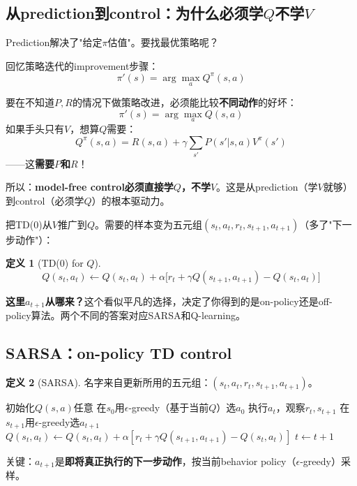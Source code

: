 \documentclass[11pt,a4paper]{article}
\theoremstyle{definition}
\newtheorem{definition}{定义}[section]
\begin{document}
\subsection{从prediction到control：为什么必须学$Q$不学$V$}

Prediction解决了"给定$\pi$估值"。要找最优策略呢？

回忆策略迭代的improvement步骤：
\[
\pi'(s) = \arg\max_a Q^\pi(s, a)
\]

\begin{plainwords}
要在不知道$P, R$的情况下做策略改进，必须能比较\textbf{不同动作}的好坏：
\[
\pi'(s) = \arg\max_a Q(s, a)
\]
如果手头只有$V$，想算$Q$需要：
\[
Q^\pi(s, a) = R(s, a) + \gamma \sum_{s'} P(s'|s, a) V^\pi(s')
\]
——这\textbf{需要$P$和$R$}！

所以：\textbf{model-free control必须直接学$Q$，不学$V$}。这是从prediction（学$V$就够）到control（必须学$Q$）的根本驱动力。
\end{plainwords}

把TD(0)从$V$推广到$Q$。需要的样本变为五元组$(s_t, a_t, r_t, s_{t+1}, a_{t+1})$（多了"下一步动作"）：

\begin{definition}[TD(0) for $Q$]
\[
Q(s_t, a_t) \leftarrow Q(s_t, a_t) + \alpha\big[r_t + \gamma Q(s_{t+1}, a_{t+1}) - Q(s_t, a_t)\big]
\]
\end{definition}

\textbf{这里$a_{t+1}$从哪来？}这个看似平凡的选择，决定了你得到的是on-policy还是off-policy算法。两个不同的答案对应SARSA和Q-learning。

\subsection{SARSA：on-policy TD control}

\begin{definition}[SARSA]
名字来自更新所用的五元组：$(s_t, a_t, r_t, s_{t+1}, a_{t+1})$。
\begin{algorithm}[H]
\caption{SARSA}
\begin{algorithmic}[1]
\State 初始化$Q(s,a)$任意
\State 在$s_0$用$\epsilon$-greedy（基于当前$Q$）选$a_0$
    \State 执行$a_t$，观察$r_t, s_{t+1}$
    \State 在$s_{t+1}$用$\epsilon$-greedy选$a_{t+1}$
    \State $Q(s_t, a_t) \leftarrow Q(s_t, a_t) + \alpha[r_t + \gamma Q(s_{t+1}, a_{t+1}) - Q(s_t, a_t)]$
    \State $t \leftarrow t+1$
\EndFor
\end{algorithmic}
\end{algorithm}

关键：$a_{t+1}$是\textbf{即将真正执行的下一步动作}，按当前behavior policy（$\epsilon$-greedy）采样。
\end{definition}
\end{document}

